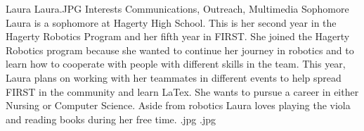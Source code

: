 \insertbio
{Laura}
{Laura.JPG}
{Interests}
{Communications, Outreach, Multimedia}
{Sophomore}
{
Laura is a sophomore at Hagerty High School. This is her second year in the Hagerty Robotics Program and her fifth year in FIRST. She joined the Hagerty Robotics program because she wanted to continue her journey in robotics and to learn how to cooperate with people with different skills in the team. This year, Laura plans on working with her teammates in different events to help spread FIRST in the community and learn LaTex. She wants to pursue a career in either Nursing or Computer Science. Aside from robotics Laura loves playing the viola and reading books during her free time.
}
{.jpg}
{.jpg}
